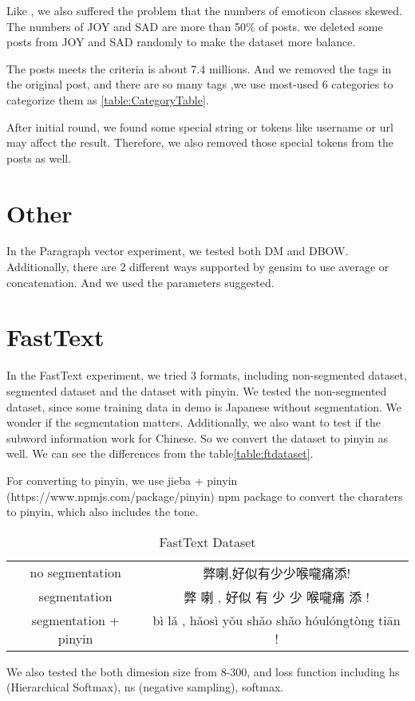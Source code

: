 Like \cite{zhao2012moodlens}, we also suffered the problem that the numbers of emoticon classes skewed. The numbers of JOY and SAD are more than 50\% of posts. 
we deleted some posts from JOY and SAD randomly to make the dataset more balance.  

The posts meets the criteria is about 7.4 millions. And we removed the tags in the original post, and there are so many tags 
,we use most-used 6 categories to categorize them as \ref{table:CategoryTable}.

After initial round, we found some special string or tokens like username or url may affect the result. 
Therefore, we also removed those special tokens from the posts as well.

\section{Other}

In the Paragraph vector experiment, we tested both DM and DBOW. Additionally, there are 2 different ways supported by gensim to use average or concatenation.
And we used the parameters suggested. 

\section{FastText}

In the FastText experiment, we tried 3 formats, including non-segmented dataset, segmented dataset and the dataset with pinyin.
We tested the non-segmented dataset, since some training data in demo is Japanese without segmentation. We wonder if the segmentation matters.
Additionally, we also want to test if the subword information work for Chinese. So we convert the dataset to pinyin as well. We can see the differences from the table\ref{table:ftdataset}.

For converting to pinyin, we use jieba + pinyin (https://www.npmjs.com/package/pinyin) npm package to convert the  charaters to pinyin, which also includes the tone.

\begin{table}[]
\centering
\caption{FastText Dataset}
\label{ftdataset}
\begin{tabular}{|c|c|}
\hline
   & \\
\hline
no segmentation  & 弊喇,好似有少少喉嚨痛添! \\
segmentation  & 弊 喇 , 好似 有 少 少 喉嚨痛 添 ! \\
segmentation + pinyin  & bì lǎ , hǎosì yǒu shǎo shǎo hóulóngtòng tiān ! \\
\hline
\end{tabular}
\end{table}

We also tested the both dimesion size from 8-300, and loss function including hs (Hierarchical Softmax), ns (negative sampling), softmax.
